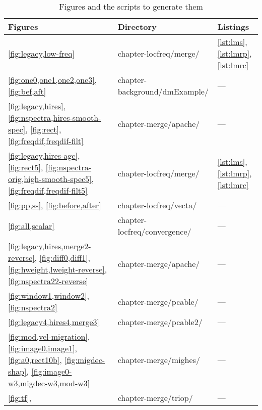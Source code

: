 \begin{table}[h]
\centering
\caption{Figures and the scripts to generate them}
\label{my-label}
\begin{tabular}{l|l|l}
\hline
        \textbf{Figures} & \textbf{Directory} & \textbf{Listings} \\ \hline 
        \ref{fig:legacy,low-freq} & chapter-locfreq/merge/ & \ref{lst:lms}, \ref{lst:lmrp}, \ref{lst:lmrc}\\ 
        \ref{fig:one0,one1,one2,one3}, \ref{fig:bef,aft} & chapter-background/dmExample/ & ---\\%
        \ref{fig:legacy,hires}, \ref{fig:nspectra,hires-smooth-spec}, \ref{fig:rect}, \ref{fig:freqdif,freqdif-filt}           & chapter-merge/apache/ & ---\\%
        \ref{fig:legacy,hires-agc}, \ref{fig:rect5}, \ref{fig:nspectra-orig,high-smooth-spec5}, \ref{fig:freqdif,freqdif-filt5}          & chapter-locfreq/merge/ &   \ref{lst:lms}, \ref{lst:lmrp}, \ref{lst:lmrc}\\ 
        \ref{fig:pp,ss}, \ref{fig:before,after}         & chapter-locfreq/vecta/&  --- \\%
        \ref{fig:all,scalar} & chapter-locfreq/convergence/&  --- \\%
        \ref{fig:legacy,hires,merge2-reverse}, \ref{fig:diff0,diff1}, \ref{fig:hweight,lweight-reverse}, \ref{fig:nspectra22-reverse}           & chapter-merge/apache/ & --- \\%
        \ref{fig:window1,window2}, \ref{fig:nspectra2} & chapter-merge/pcable/ & --- \\%
        \ref{fig:legacy4,hires4,merge3}  & chapter-merge/pcable2/ &  --- \\%
        \ref{fig:mod,vel-migration}, \ref{fig:image0,image1}, \ref{fig:a0,rect10b}, \ref{fig:migdec-shap}, \ref{fig:image0-w3,migdec-w3,mod-w3} & chapter-merge/mighes/ & --- \\%
        \ref{fig:tf}, & chapter-merge/triop/ & --- \\%
\end{tabular}
\end{table}

